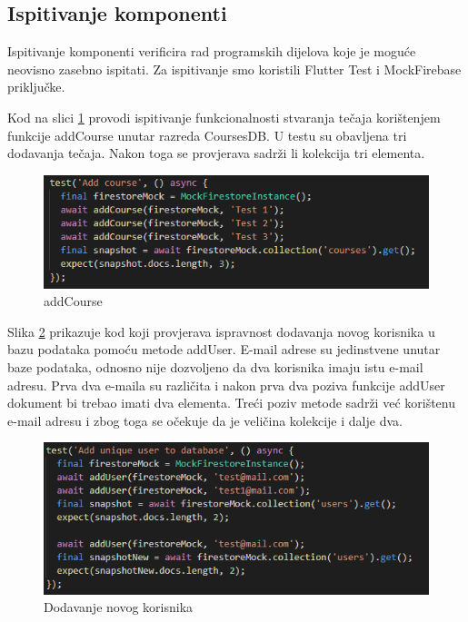 			\subsection{Ispitivanje komponenti}
			
			Ispitivanje komponenti verificira rad programskih dijelova koje je moguće neovisno zasebno ispitati. Za ispitivanje smo koristili Flutter Test i MockFirebase priključke.
			
			Kod na slici \ref{fig:addCourse} provodi ispitivanje funkcionalnosti stvaranja tečaja korištenjem funkcije addCourse unutar razreda CoursesDB. U testu su obavljena tri dodavanja tečaja. Nakon toga se provjerava sadrži li kolekcija tri elementa.
			
			\begin{figure}[h]
				\includegraphics[scale=0.75]{slike/addCourse.PNG}
				\centering
				\caption{addCourse}
				\label{fig:addCourse}
			\end{figure}
			
			Slika \ref{fig:addUniqueUser} prikazuje kod koji provjerava ispravnost dodavanja novog korisnika u bazu podataka pomoću metode addUser. E-mail adrese su jedinstvene unutar baze podataka, odnosno nije dozvoljeno da dva korisnika imaju istu e-mail adresu. Prva dva e-maila su različita i nakon prva dva poziva funkcije addUser dokument bi trebao imati dva elementa. Treći poziv metode sadrži već korištenu e-mail adresu i zbog toga se očekuje da je veličina kolekcije i dalje dva.
			
			\begin{figure}[h]
				\includegraphics[scale=0.75]{slike/addUniqueUser.PNG}
				\centering
				\caption{Dodavanje novog korisnika}
				\label{fig:addUniqueUser}
			\end{figure}
			

